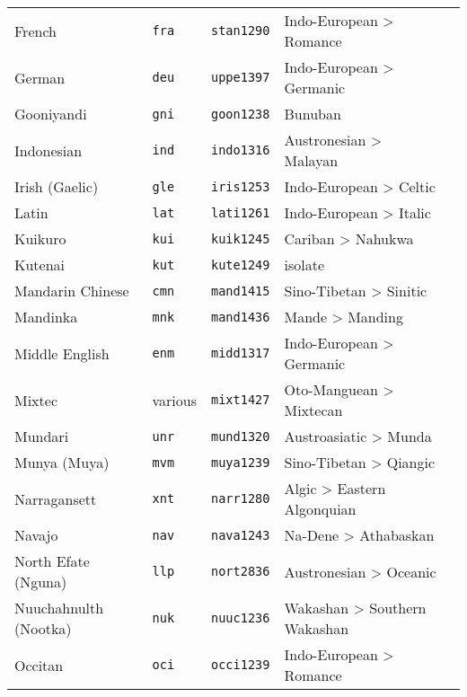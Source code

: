 \begin{longtable}[c]{ l l l l l }
  French                           & \texttt{fra}       & \texttt{stan1290}   & Indo-European > Romance\\
  German                           & \texttt{deu}       & \texttt{uppe1397}   & Indo-European > Germanic\\
  Gooniyandi                       & \texttt{gni}       & \texttt{goon1238}   & Bunuban\\
  Indonesian                       & \texttt{ind}       & \texttt{indo1316}   & Austronesian > Malayan\\
  Irish (Gaelic)                   & \texttt{gle}       & \texttt{iris1253}   & Indo-European > Celtic\\
  Latin                            & \texttt{lat}       & \texttt{lati1261}   & Indo-European > Italic\\
  Kuikuro                          & \texttt{kui}       & \texttt{kuik1245}   & Cariban > Nahukwa\\
  Kutenai                          & \texttt{kut}       & \texttt{kute1249}   & isolate\\
  Mandarin Chinese                 & \texttt{cmn}       & \texttt{mand1415}   & Sino-Tibetan > Sinitic\\
  Mandinka                         & \texttt{mnk}       & \texttt{mand1436}   & Mande > Manding\\
  Middle English                   & \texttt{enm}       & \texttt{midd1317}   & Indo-European > Germanic\\
  Mixtec                           & various            & \texttt{mixt1427}   & Oto-Manguean > Mixtecan\\
  Mundari                          & \texttt{unr}       & \texttt{mund1320}   & Austroasiatic > Munda\\
  Munya (Muya)                     & \texttt{mvm}       & \texttt{muya1239}   & Sino-Tibetan > Qiangic\\
  Narragansett                     & \texttt{xnt}       & \texttt{narr1280}   & Algic > Eastern Algonquian\\
  Navajo                           & \texttt{nav}       & \texttt{nava1243}   & Na-Dene > Athabaskan\\
  North Efate (Nguna)              & \texttt{llp}       & \texttt{nort2836}   & Austronesian > Oceanic\\
  Nuuchahnulth (Nootka)            & \texttt{nuk}       & \texttt{nuuc1236}   & Wakashan > Southern Wakashan\\
  Occitan                          & \texttt{oci}       & \texttt{occi1239}   & Indo-European > Romance\\

\end{longtable}
